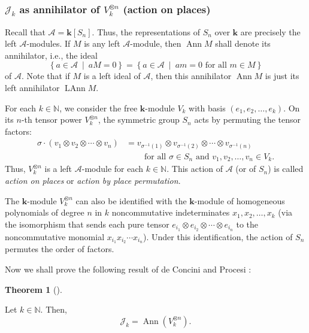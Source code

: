 \documentclass[numbers=enddot,12pt,final,onecolumn,notitlepage]{scrartcl}%
\numberwithin{exer}{subsection}
\theoremstyle{definition}
\newtheorem{theo}{Theorem}[subsection]
\newenvironment{theorem}[1][]
{\begin{theo}[#1]\begin{leftbar}}
{\end{leftbar}\end{theo}}
\begin{document}
\subsubsection{$\mathcal{J}_{k}$ as annihilator of $V_{k}^{\otimes n}$ (action
on places)}

Recall that $\mathcal{A}=\mathbf{k}\left[  S_{n}\right]  $. Thus, the
representations of $S_{n}$ over $\mathbf{k}$ are precisely the left
$\mathcal{A}$-modules. If $M$ is any left $\mathcal{A}$-module, then
$\operatorname*{Ann}M$ shall denote its annihilator, i.e., the ideal
\[
\left\{  a\in\mathcal{A}\ \mid\ aM=0\right\}  =\left\{  a\in\mathcal{A}%
\ \mid\ am=0\text{ for all }m\in M\right\}
\]
of $\mathcal{A}$. Note that if $M$ is a left ideal of $\mathcal{A}$, then this
annihilator $\operatorname*{Ann}M$ is just its left annihilator
$\operatorname*{LAnn}M$.

For each $k\in\mathbb{N}$, we consider the free $\mathbf{k}$-module $V_{k}$
with basis $\left(  e_{1},e_{2},\ldots,e_{k}\right)  $. On its $n$-th tensor
power $V_{k}^{\otimes n}$, the symmetric group $S_{n}$ acts by permuting the
tensor factors:%
\begin{align*}
\sigma\cdot\left(  v_{1}\otimes v_{2}\otimes\cdots\otimes v_{n}\right)   &
=v_{\sigma^{-1}\left(  1\right)  }\otimes v_{\sigma^{-1}\left(  2\right)
}\otimes\cdots\otimes v_{\sigma^{-1}\left(  n\right)  }\\
&  \ \ \ \ \ \ \ \ \ \ \text{for all }\sigma\in S_{n}\text{ and }v_{1}%
,v_{2},\ldots,v_{n}\in V_{k}.
\end{align*}
Thus, $V_{k}^{\otimes n}$ is a left $\mathcal{A}$-module for each
$k\in\mathbb{N}$. This action of $\mathcal{A}$ (or of $S_{n}$) is called
\emph{action on places} or \emph{action by place permutation}.

The $\mathbf{k}$-module $V_{k}^{\otimes n}$ can also be identified with the
$\mathbf{k}$-module of homogeneous polynomials of degree $n$ in $k$
noncommutative indeterminates $x_{1},x_{2},\ldots,x_{k}$ (via the isomorphism
that sends each pure tensor $e_{i_{1}}\otimes e_{i_{2}}\otimes\cdots\otimes
e_{i_{n}}$ to the noncommutative monomial $x_{i_{1}}x_{i_{2}}\cdots x_{i_{n}}%
$). Under this identification, the action of $S_{n}$ permutes the order of factors.

Now we shall prove the following result of de Concini and Procesi
\cite[Theorem 4.2]{deCPro76}:

\begin{theorem}
\label{thm.AnnVkn}Let $k\in\mathbb{N}$. Then,%
\[
\mathcal{J}_{k}=\operatorname*{Ann}\left(  V_{k}^{\otimes n}\right)  .
\]

\end{theorem}
\end{document}
